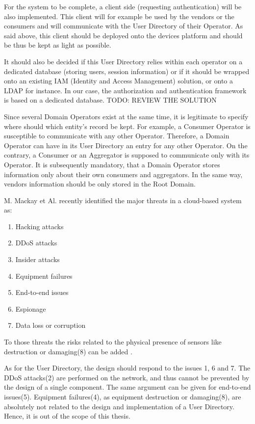 For the system to be complete, a client side (requesting authentication) will be also implemented. This client will for example be used by the vendors or the consumers and will communicate with the User Directory of their Operator. As said above, this client should be deployed onto the devices platform and should be thus be kept as light as possible.

It should also be decided if this User Directory relies within each operator on a dedicated database (storing users, session information) or if it should be wrapped onto an existing IAM (Identity and Access Management) solution, or onto a LDAP for instance. In our case, the authorization and authentication framework is based on a dedicated database.
{ \huge TODO: REVIEW THE SOLUTION }

Since several Domain Operators exist at the same time, it is legitimate to specify where should which entity's record be kept. For example, a Consumer Operator is susceptible to communicate with any other Operator. Therefore, a Domain Operator can have in its User Directory an entry for any other Operator. On the contrary, a Consumer or an Aggregator is supposed to communicate only with its Operator. It is subsequently mandatory, that a Domain Operator stores information only about their own consumers and aggregators. In the same way, vendors information should be only stored in the Root Domain.

M. Mackay et Al. recently identified the major threats in a cloud-based system as\cite{Mackay2012}: 
\begin{enumerate}
	\item Hacking attacks
	\item DDoS attacks
	\item Insider attacks
	\item Equipment failures
	\item End-to-end issues
	\item Espionage
	\item Data loss or corruption
\end{enumerate}

To those threats the risks related to the physical presence of sensors like destruction or damaging(8) can be added .

As for the User Directory, the design should respond to the issues 1, 6 and 7. The DDoS attacks(2) are performed on the network, and thus cannot be prevented by the design of a single component. The same argument can be given for end-to-end issues(5). Equipment failures(4), as equipment destruction or damaging(8), are absolutely not related to the design and implementation of a User Directory. Hence, it is out of the scope of this thesis. 

